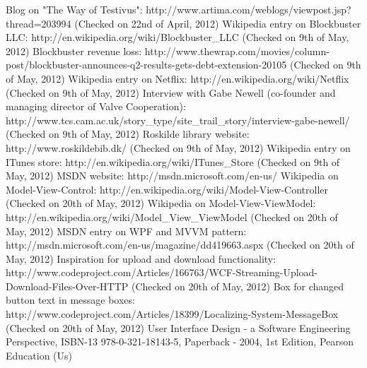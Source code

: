 \begin{thebibliography}{9}
\label{Biblio}
 Blog on "The Way of Testivus": http://www.artima.com/weblogs/viewpost.jsp?thread=203994 (Checked on 22nd of April, 2012)
 Wikipedia entry on Blockbuster LLC: http://en.wikipedia.org/wiki/Blockbuster\_LLC (Checked on 9th of May, 2012)
 Blockbuster revenue loss:  http://www.thewrap.com/movies/column-post/blockbuster-announces-q2-results-gets-debt-extension-20105 (Checked on 9th of May, 2012)
 Wikipedia entry on Netflix: http://en.wikipedia.org/wiki/Netflix (Checked on 9th of May, 2012)
 Interview with Gabe Newell (co-founder and managing director of Valve Cooperation): http://www.tcs.cam.ac.uk/story\_type/site\_trail\_story/interview-gabe-newell/ (Checked on 9th of May, 2012)
 Roskilde library website: http://www.roskildebib.dk/ (Checked on 9th of May, 2012)
 Wikipedia entry on ITunes store: http://en.wikipedia.org/wiki/ITunes\_Store (Checked on 9th of May, 2012)
 MSDN website: http://msdn.microsoft.com/en-us/ 
 Wikipedia on Model-View-Control: http://en.wikipedia.org/wiki/Model-View-Controller (Checked on 20th of May, 2012)
 Wikipedia on Model-View-ViewModel: http://en.wikipedia.org/wiki/Model\_View\_ViewModel (Checked on 20th of May, 2012)
 MSDN entry on WPF and MVVM pattern: http://msdn.microsoft.com/en-us/magazine/dd419663.aspx (Checked on 20th of May, 2012)
 Inspiration for upload and download functionality:  http://www.codeproject.com/Articles/166763/WCF-Streaming-Upload-Download-Files-Over-HTTP (Checked on 20th of May, 2012)
 Box for changed button text in message boxes: http://www.codeproject.com/Articles/18399/Localizing-System-MessageBox (Checked on 20th of May, 2012)
 User Interface Design - a Software Engineering Perspective, ISBN-13 978-0-321-18143-5, Paperback - 2004, 1st Edition, Pearson Education (Us)
\end{thebibliography}
